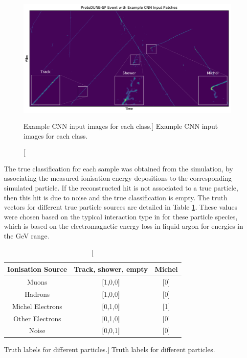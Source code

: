 \begin{figure}
	\centering
	\includegraphics[width=\textwidth]{figures/patch_zoom.pdf}  
	\caption
	[Example CNN input images for each class.]
	{Example CNN input images for each class.}
	\label{fig:patches}
\end{figure}

The true classification for each sample was obtained from the simulation, by 
associating the measured ionisation energy depositions to the corresponding
simulated particle. If the reconstructed hit is not associated to a true
particle, then this hit is due to noise and the true classification is empty.
The truth vectors for different true particle sources are detailed in Table
\ref{tab:ground_truth}. These values were chosen based on the typical
interaction type in \protodune{} for these particle species, which is based on
the electromagnetic energy loss in liquid argon for energies in the GeV range.

\begin{table}
	\centering
	\bgroup
	\def\arraystretch{1.5}
	\begin{tabular}{c|c|c}
		Ionisation Source & Track, shower, empty & Michel \\ \hline
		Muons             & [1,0,0]              & [0]    \\
		Hadrons           & [1,0,0]              & [0]    \\
		Michel Electrons  & [0,1,0]              & [1]    \\
		Other Electrons   & [0,1,0]              & [0]    \\
		Noise             & [0,0,1]              & [0]    \\
	\end{tabular}
	\egroup
	\caption
	[Truth labels for different particles.]
	{Truth labels for different particles.}
	\label{tab:ground_truth}
\end{table}

